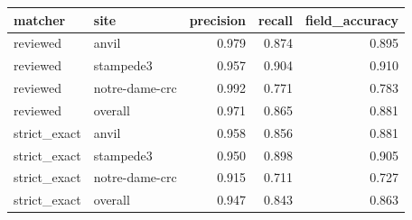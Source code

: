 \begin{tabular}{llrrr}
\toprule
matcher & site & precision & recall & field_accuracy \\
\midrule
reviewed & anvil & 0.979 & 0.874 & 0.895 \\
reviewed & stampede3 & 0.957 & 0.904 & 0.910 \\
reviewed & notre-dame-crc & 0.992 & 0.771 & 0.783 \\
reviewed & overall & 0.971 & 0.865 & 0.881 \\
strict_exact & anvil & 0.958 & 0.856 & 0.881 \\
strict_exact & stampede3 & 0.950 & 0.898 & 0.905 \\
strict_exact & notre-dame-crc & 0.915 & 0.711 & 0.727 \\
strict_exact & overall & 0.947 & 0.843 & 0.863 \\
\bottomrule
\end{tabular}
